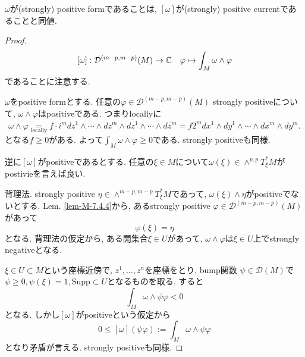 \begin{tcolorbox}[mybox]
\begin{lem}
\label{lem-M-7.4.5}
$\omega$が(strongly) positive formであることは, 
$[\omega]$が(strongly) positive currentであることと同値. 
\end{lem}
\end{tcolorbox}
\begin{proof}
$$
[\omega]
:
\mathcal{D}^{(m-p,m-p)}(M) \to \mathbb{C}
\quad \varphi \mapsto \int_M \omega \wedge \varphi
$$
であることに注意する. 

$\omega$をpositive formとする. 
任意の$\varphi \in \mathcal{D}^{(m-p,m-p)}(M)$ strongly positiveについて, 
$\omega \wedge \varphi$はpositiveである. 
つまりlocallyに
$$
\omega \wedge \varphi
\underset{\text{locally}}{=}
f\cdot i^{m}dz^1 \wedge \cdots \wedge dz^m \wedge \overline{dz^1} \wedge \cdots \wedge \overline{dz^m}
 =f 2^m dx^1\wedge dy^1\wedge\cdots\wedge dx^m\wedge dy^m.
$$となる$f \ge 0$がある. 
よって$\int_M \omega \wedge \varphi \ge 0$である. strongly positiveも同様. 

逆に$[\omega]$がpositiveであるとする. 
任意の$\xi \in M$について$\omega(\xi) \in \wedge^{p,p}T^{*}_\xi M$がpostivieを言えば良い. 

背理法. strongly positive $\eta \in \wedge^{m-p,m-p}T^{*}_\xi M$であって, $\omega(\xi) \wedge \eta$がpositiveでないとする. 
Lem. \ref{lem-M-7.4.4}から, あるstrongly positive $\varphi \in   {\mathcal{D}}^{(m-p,m-p)}(M)$があって
$$
\varphi(\xi)=\eta
$$
となる. 
背理法の仮定から, 
ある開集合$ \xi \in U$があって, $\omega \wedge \varphi$は$\xi \in U$上でstrongly negativeとなる.

$\xi \in U \subset M$という座標近傍で, $z^1, \ldots, z^n$を座標をとり, 
bump関数
$\psi \in {\mathcal{D}}(M)$で$\psi \ge 0, \psi(\xi)=1, \mathrm{Supp} \subset U$となるものを取る.
すると
$$
\int_{M}\omega \wedge \psi  \varphi <0
$$
となる. 
しかし$[\omega]$がpositiveという仮定から
$$
0 \le [\omega](\psi \varphi):=\int_{M}\omega \wedge \psi  \varphi 
$$
となり矛盾が言える.
strongly positiveも同様.
\end{proof}


